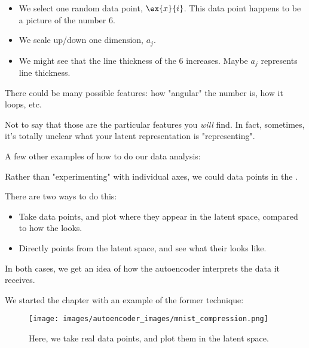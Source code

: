         \begin{itemize}
            \item We select one random data point, $\ex{x}{i}$. This data point happens to be a picture of the number 6.
            \item We scale up/down one dimension, $a_j$.
            \item We might see that the line thickness of the 6 increases. Maybe $a_j$ represents line thickness.
        \end{itemize}

        There could be many possible features: how "angular" the number is, how it loops, etc.

        Not to say that those are the particular features you \textit{will} find. In fact, sometimes, it's totally unclear what your latent representation is "representing".

        \subsecdiv

        A few other examples of how to do our data analysis:\\

        \begin{concept}
            Rather than "experimenting" with individual axes, we could  data points in the .

            There are two ways to do this:

            \begin{itemize}
                \item Take  data points, and plot where they appear in the latent space, compared to how the  looks.

                \item Directly  points from the latent space, and see what their  looks like.
            \end{itemize}

            In both cases, we get an idea of how the autoencoder interprets the data it receives.
        \end{concept}

        \miniex We started the chapter with an example of the former technique:

        \begin{figure}[H]
            \centering
            \texttt{[image: images/autoencoder\_images/mnist\_compression.png]}
            \caption*{Here, we take real data points, and plot them in the latent space.}
        \end{figure}

